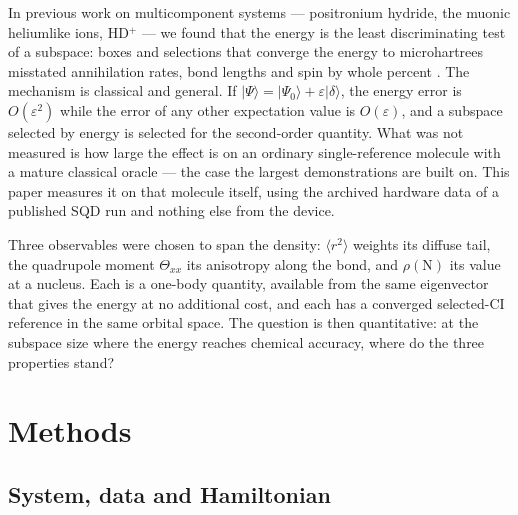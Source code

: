 \documentclass[11pt]{article}
\begin{document}
In previous work on multicomponent systems --- positronium hydride, the muonic heliumlike ions, HD$^+$ --- we found that the energy is the least discriminating test of a subspace: boxes and selections that converge the energy to microhartrees misstated annihilation rates, bond lengths and spin by whole percent \cite{ECGseedingSQD}. The mechanism is classical and general. If $|\Psi\rangle=|\Psi_0\rangle+\varepsilon|\delta\rangle$, the energy error is $O(\varepsilon^{2})$ while the error of any other expectation value is $O(\varepsilon)$, and a subspace selected by energy is selected for the second-order quantity. What was not measured is how large the effect is on an ordinary single-reference molecule with a mature classical oracle --- the case the largest demonstrations are built on. This paper measures it on that molecule itself, using the archived hardware data of a published SQD run and nothing else from the device.

Three observables were chosen to span the density: $\langle r^{2}\rangle$ weights its diffuse tail, the quadrupole moment $\Theta_{xx}$ its anisotropy along the bond, and $\rho(\mathrm{N})$ its value at a nucleus. Each is a one-body quantity, available from the same eigenvector that gives the energy at no additional cost, and each has a converged selected-CI reference in the same orbital space. The question is then quantitative: at the subspace size where the energy reaches chemical accuracy, where do the three properties stand?


\section{Methods}\label{sec:2}


\subsection{System, data and Hamiltonian}\label{sec:2.1}
\end{document}
